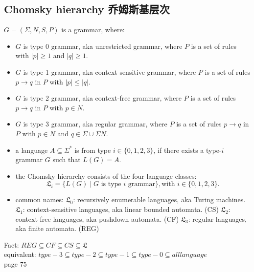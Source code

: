 \documentclass[a4paper,11pt,utf8]{article}
\newcommand{\lineindent}{\hspace*{\parindent}}
\begin{document}
\subsection{Chomsky hierarchy 乔姆斯基层次}
\begin{tcolorbox}[title=Chomsky hierarchy,colback=white,colframe=black,width=\textwidth,arc=0pt]
    $G = (\Sigma,N,S,P)$ is a grammar, where:
    \begin{itemize}
        \item $G$ is type 0 grammar, aka unrestricted grammar, where $P$ is a set of rules with $|p| \geq 1$ and $|q| \geq 1$.
        \item $G$ is type 1 grammar, aka context-sensitive grammar, where $P$ is a set of rules $p \to q$ in $P$ with $|p| \leq |q|$.
        \item $G$ is type 2 grammar, aka context-free grammar, where $P$ is a set of rules $p \to q$ in $P$ with $p \in N$.
        \item $G$ is type 3 grammar, aka regular grammar, where $P$ is a set of rules $p \to q$ in $P$ with $p \in N$ and $q \in \Sigma \cup \Sigma N$.
        \item a language $A \subseteq \Sigma^*$ is from type $i \in \{0,1,2,3\}$, if there exists a type-$i$ grammar $G$ such that $L(G) = A$.
        \item the Chomsky hierarchy consists of the four language classes: \[
            \mathfrak{L}_i = \{L(G) \mid G \text{ is type } i \text{ grammar}\}, \text{with } i \in \{0,1,2,3\}.
        \]
        \item common names:
        \subitem $\mathfrak{L}_0$: recursively enumerable languages, aka Turing machines.
        \subitem $\mathfrak{L}_1$: context-sensitive languages, aka linear bounded automata. (CS)
        \subitem $\mathfrak{L}_2$: context-free languages, aka pushdown automata. (CF)
        \subitem $\mathfrak{L}_3$: regular languages, aka finite automata. (REG)
    \end{itemize}
\end{tcolorbox}
Fact: $REG \subseteq CF \subseteq CS \subseteq \mathfrak{L}$ \\
\lineindent equivalent: $type-3 \subseteq type-2 \subseteq type-1 \subseteq type-0 \subseteq all language$ \\
page 75


% 
\end{document}
